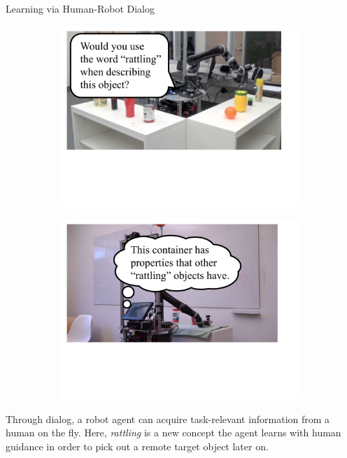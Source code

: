 \documentclass[final]{beamer}
\newcommand{\setblocksize}{\Large \centering}
\newcommand{\paragraphbreak}{\vspace{1cm}}
\begin{document}
\begin{frame}{}
\begin{columns}[t]
\begin{column}{.24\linewidth}
\begin{block}{\setblocksize Learning via Human-Robot Dialog}
{\begin{figure}
\centering
  \begin{subfigure}{0.9\textwidth}
    \centering
    \includegraphics[width=\linewidth]{figures/rattling_ask.pdf}
    \vspace{-4cm}
  \end{subfigure}
  \begin{subfigure}{0.92\textwidth}
    \centering
    \includegraphics[width=\linewidth]{figures/rattling_think.pdf}
    \vspace{-4cm}
  \end{subfigure}
\end{figure}
Through dialog, a robot agent can acquire task-relevant information from a human on the fly.
Here, \emph{rattling} is a new concept the agent learns with human guidance in order to pick out a remote target object later on.
\paragraphbreak

}
\end{block}
\end{column}
\end{columns}
\end{frame}
\end{document}
